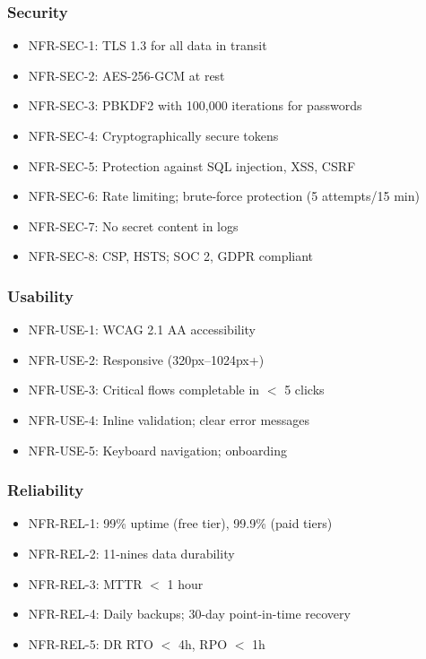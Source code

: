 \documentclass[12pt,a4paper]{article}
\begin{document}
\subsubsection{Security}
\begin{itemize}[leftmargin=*, itemsep=0.1em]
  \item NFR-SEC-1: TLS 1.3 for all data in transit
  \item NFR-SEC-2: AES-256-GCM at rest
  \item NFR-SEC-3: PBKDF2 with 100,000 iterations for passwords
  \item NFR-SEC-4: Cryptographically secure tokens
  \item NFR-SEC-5: Protection against SQL injection, XSS, CSRF
  \item NFR-SEC-6: Rate limiting; brute-force protection (5 attempts/15 min)
  \item NFR-SEC-7: No secret content in logs
  \item NFR-SEC-8: CSP, HSTS; SOC 2, GDPR compliant
\end{itemize}

\subsubsection{Usability}
\begin{itemize}[leftmargin=*, itemsep=0.1em]
  \item NFR-USE-1: WCAG 2.1 AA accessibility
  \item NFR-USE-2: Responsive (320px--1024px+)
  \item NFR-USE-3: Critical flows completable in $<$ 5 clicks
  \item NFR-USE-4: Inline validation; clear error messages
  \item NFR-USE-5: Keyboard navigation; onboarding
\end{itemize}

\subsubsection{Reliability}
\begin{itemize}[leftmargin=*, itemsep=0.1em]
  \item NFR-REL-1: 99\% uptime (free tier), 99.9\% (paid tiers)
  \item NFR-REL-2: 11-nines data durability
  \item NFR-REL-3: MTTR $<$ 1 hour
  \item NFR-REL-4: Daily backups; 30-day point-in-time recovery
  \item NFR-REL-5: DR RTO $<$ 4h, RPO $<$ 1h
\end{itemize}
\end{document}
